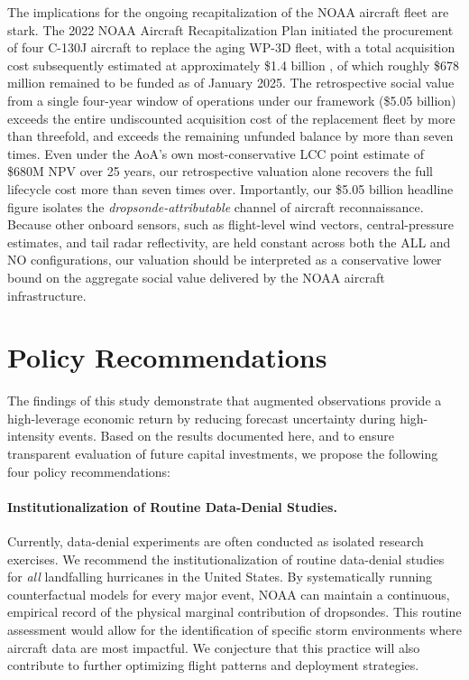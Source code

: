 \documentclass[12pt]{article}%
\begin{document}
The implications for the ongoing recapitalization of the NOAA aircraft fleet are stark. The 2022 NOAA Aircraft Recapitalization Plan \citep{NOAA2022AircraftPlan} initiated the procurement of four C-130J aircraft to replace the aging WP-3D fleet, with a total acquisition cost subsequently estimated at approximately \$1.4 billion \citep{GAO2025HurricaneHunter}, of which roughly \$678 million remained to be funded as of January 2025. The retrospective social value from a single four-year window of operations under our framework (\$5.05 billion) exceeds the entire undiscounted acquisition cost of the replacement fleet by more than threefold, and exceeds the remaining unfunded balance by more than seven times. Even under the AoA's own most-conservative LCC point estimate of \$680M NPV over 25 years, our retrospective valuation alone recovers the full lifecycle cost more than seven times over. Importantly, our \$5.05 billion headline figure isolates the \emph{dropsonde-attributable} channel of aircraft reconnaissance. Because other onboard sensors, such as flight-level wind vectors, central-pressure estimates, and tail radar reflectivity, are held constant across both the ALL and NO configurations, our valuation should be interpreted as a conservative lower bound on the aggregate social value delivered by the NOAA aircraft infrastructure.

\section{Policy Recommendations} \label{sec:policyrecs}

The findings of this study demonstrate that augmented observations provide a high-leverage economic return by reducing forecast uncertainty during high-intensity events. Based on the results documented here, and to ensure transparent evaluation of future capital investments, we propose the following four policy recommendations:

\paragraph{Institutionalization of Routine Data-Denial Studies.}
Currently, data-denial experiments are often conducted as isolated research exercises. We recommend the institutionalization of routine data-denial studies for \emph{all} landfalling hurricanes in the United States. By systematically running counterfactual models for every major event, NOAA can maintain a continuous, empirical record of the physical marginal contribution of dropsondes. This routine assessment would allow for the identification of specific storm environments where aircraft data are most impactful. We conjecture that this practice will also contribute to further optimizing flight patterns and deployment strategies.
\end{document}
